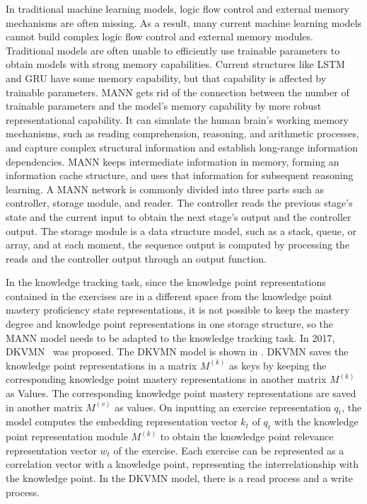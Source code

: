 In traditional machine learning models, logic flow control and external memory mechanisms are often missing. As a result, many current machine learning models cannot build complex logic flow control and external memory modules. Traditional models are often unable to efficiently use trainable parameters to obtain models with strong memory capabilities. Current structures like LSTM and GRU have some memory capability, but that capability is affected by trainable parameters. MANN gets rid of the connection between the number of trainable parameters and the model's memory capability by more robust representational capability. It can simulate the human brain's working memory mechanisms, such as reading comprehension, reasoning, and arithmetic processes, and capture complex structural information and establish long-range information dependencies. MANN keeps intermediate information in memory, forming an information cache structure, and uses that information for subsequent reasoning learning. A MANN network is commonly divided into three parts such as controller, storage module, and reader. The controller reads the previous stage's state and the current input to obtain the next stage's output and the controller output. The storage module is a data structure model, such as a stack, queue, or array, and at each moment, the sequence output is computed by processing the reads and the controller output through an output function.

In the knowledge tracking task, since the knowledge point representations contained in the exercises are in a different space from the knowledge point mastery proficiency state representations, it is not possible to keep the mastery degree and knowledge point representations in one storage structure, so the MANN model needs to be adapted to the knowledge tracking task. In 2017, DKVMN~\cite{zhang2017dynamic} was proposed. The DKVMN model is shown in \figname{\ref{fig:ch3-dkvmn-model}}. DKVMN saves the knowledge point representations in a matrix \(M^{(k)}\) as keys by keeping the corresponding knowledge point mastery representations in another matrix \(M^{(k)}\) as Values. The corresponding knowledge point mastery representations are saved in another matrix \(M^{(v)}\) as values. On inputting an exercise representation \(q_t\), the model computes the embedding representation vector \(k_t\) of \(q_t\) with the knowledge point representation module \(M^{(k)}\) to obtain the knowledge point relevance representation vector \(w_t\) of the exercise. Each exercise can be represented as a correlation vector with a knowledge point, representing the interrelationship with the knowledge point. In the DKVMN model, there is a read process and a write process.

